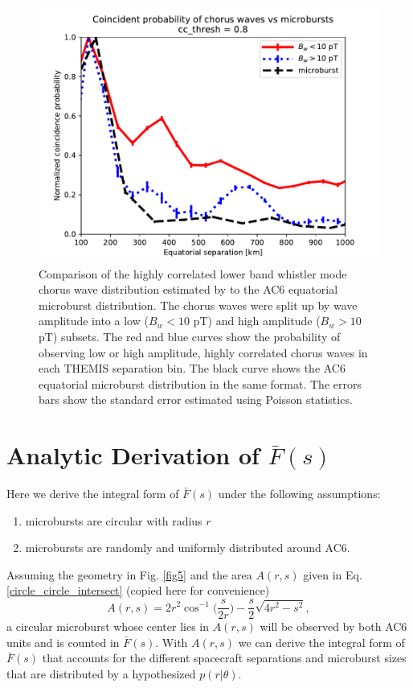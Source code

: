 \documentclass[draft]{agujournal2019}
\begin{document}
\begin{figure}
\includegraphics[width=\textwidth]{appendixa_compare_chorus_microburst_fraction_cc_thresh_8.pdf}
\caption{Comparison of the highly correlated lower band whistler mode chorus wave distribution estimated by  to the AC6 equatorial microburst distribution. The chorus waves were split up by wave amplitude into a low ($B_w < 10$ pT) and high amplitude ($B_w > 10$ pT) subsets. The red and blue curves show the probability of observing low or high amplitude, highly correlated chorus waves in each THEMIS separation bin. The black curve shows the AC6 equatorial microburst distribution in the same format. The errors bars show the standard error estimated using Poisson statistics.}
\label{fig_appendixa_1}
\end{figure}

\section{Analytic Derivation of $\bar{F}(s)$} \label{appendixb}
Here we derive the integral form of $\bar{F}(s)$ under the following assumptions:

\begin{enumerate}
\item microbursts are circular with radius $r$
\item microbursts are randomly and uniformly distributed around AC6.
\end{enumerate} Assuming the geometry in Fig. \ref{fig5} and the area $A(r, s)$ given in Eq. \ref{circle_circle_intersect} (copied here for convenience)
\begin{equation}
A(r, s) = 2r^2 \cos^{-1}{\Big( \frac{s}{2r} \Big)} - \frac{s}{2} \sqrt{4r^2 - s^2},
\end{equation} a circular microburst whose center lies in $A(r, s)$ will be observed by both AC6 units and is counted in $\bar{F}(s)$. With $A(r, s)$ we can derive the integral form of $\bar{F}(s)$ that accounts for the different spacecraft separations and microburst sizes that are distributed by a hypothesized $p(r | \theta)$.
\end{document}
